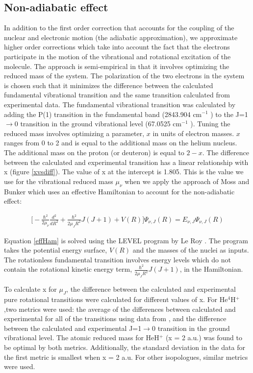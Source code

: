 \documentclass[aps,onecolumn]{revtex4}
\begin{document}
\subsection{Non-adiabatic effect}
In addition to the first order correction that accounts for the coupling of the nuclear and electronic
motion (the adiabatic approximation), we approximate higher order corrections which take into account
the fact that the electrons participate in the motion of the vibrational and rotational excitation of
the molecule. The approach is semi-empirical in that it involves optimizing the reduced mass of the system.
The polarization of the two electrons in the system is chosen such that it minimizes the difference between
the calculated fundamental vibrational transition and the same transition calculated from experimental data.
The fundamental vibrational transition was calculated by adding the P(1) transition in the fundamental band
(2843.904 cm$^{-1}$ \cite{exp4}) to the J=1$\rightarrow$0 transition in the ground vibrational level
(67.0525 cm$^{-1}$ \cite{exp1}). Tuning the reduced mass involves optimizing a parameter, $x$ in units of
electron masses. $x$ ranges from 0 to 2 and is equal to the additional mass on the helium nucleus. The
additional mass on the proton (or deuteron) is equal to $2-x$. The difference between the calculated
and experimental transition has a linear relationship with x (figure \ref{xvsdiff}). The value of x at the
intercept is 1.805. This is the value we use for the vibrational reduced mass $\mu_{\nu}$ when we apply
the approach of Moss and Bunker \cite{nonAdiab2, nonAdiab1} which uses an effective Hamiltonian to
account for the non-adiabatic effect:

\begin{eqnarray}
\Bigg[-\frac{\hbar^2}{2\mu_{\nu}}\frac{d^2}{dR^2} + \frac{\hbar^2}{2\mu_JR^2}J(J+1) + V(R)\Bigg]
\Psi_{\nu,J}(R) = E_{\nu,J}\Psi_{\nu,J}(R)
\label{effHam}
\end{eqnarray}

Equation \ref{effHam} is solved using the LEVEL program by Le Roy \cite{LEVEL}. The program takes the
potential energy surface, $V(R)$ and the masses of the nuclei as inputs. The rotationless fundamental
transition involves energy levels which do not contain the rotational kinetic energy term,
$\frac{\hbar^2}{2\mu_JR^2}J(J+1)$, in the Hamiltonian.

To calculate x for $\mu_J$, the difference between the calculated and experimental pure rotational
transitions were calculated for different values of x. For He$^4$H$^+$ ,two metrics were used: the
average of the differences between calculated and experimental for all of the transitions using data
from \cite{exp1, exp7, exp9}, and the difference between the calculated and experimental J=1$\rightarrow$0
transition in the ground vibrational level. The atomic reduced mass for HeH$^+$ (x = 2 a.u.) was found
to be optimal by both metrics. Additionally, the standard deviation in the data for the first metric is
smallest when x = 2 a.u. For other isopologues, similar metrics were used.
\end{document}
